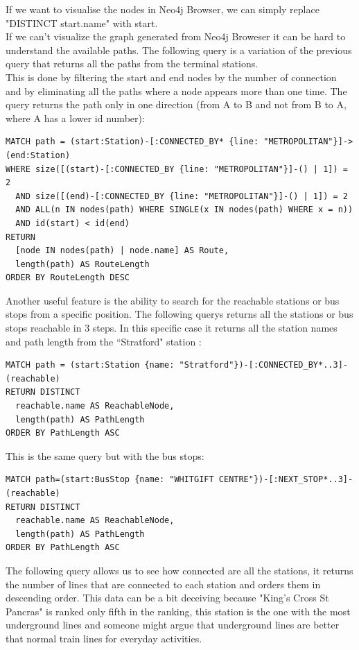 \documentclass{Configuration_Files/PoliMi3i_thesis}
\begin{document}
If we want to visualise the nodes in Neo4j Browser, we can simply replace "DISTINCT start.name" with start.\\

If we can't visualize the graph generated from Neo4j Broweser it can be hard to understand the available paths. The following query is a variation of the previous query that returns all the paths from the terminal stations.\\
This is done by filtering the start and end nodes by the number of connection and by eliminating all the paths where a node appears more than one time. The query returns the path only in one direction (from A to B and not from B to A, where A has a lower id number):

\begin{lstlisting}[language=Cypher]
MATCH path = (start:Station)-[:CONNECTED_BY* {line: "METROPOLITAN"}]->(end:Station)
WHERE size([(start)-[:CONNECTED_BY {line: "METROPOLITAN"}]-() | 1]) = 2
  AND size([(end)-[:CONNECTED_BY {line: "METROPOLITAN"}]-() | 1]) = 2
  AND ALL(n IN nodes(path) WHERE SINGLE(x IN nodes(path) WHERE x = n))
  AND id(start) < id(end)
RETURN 
  [node IN nodes(path) | node.name] AS Route,
  length(path) AS RouteLength
ORDER BY RouteLength DESC
\end{lstlisting}

Another useful feature is the ability to search for the reachable stations or bus stops from a specific position.
The following querys returns all the stations or bus stops reachable in 3 steps. In this specific case it returns all the station names and path length from the ``Stratford" station :

\begin{lstlisting}[language=Cypher]
MATCH path = (start:Station {name: "Stratford"})-[:CONNECTED_BY*..3]-(reachable)
RETURN DISTINCT 
  reachable.name AS ReachableNode,
  length(path) AS PathLength
ORDER BY PathLength ASC
\end{lstlisting}

This is the same query but with the bus stops:

\begin{lstlisting}[language=Cypher]
MATCH path=(start:BusStop {name: "WHITGIFT CENTRE"})-[:NEXT_STOP*..3]-(reachable)
RETURN DISTINCT 
  reachable.name AS ReachableNode,
  length(path) AS PathLength
ORDER BY PathLength ASC
\end{lstlisting}

The following query allows us to see how connected are all the stations, it returns the number of lines that are connected to each station and orders them in descending order. This data can be a bit deceiving because "King's Cross St Pancras" is ranked only fifth in the ranking, this station is the one with the most underground lines and someone might argue that underground lines are better that normal train lines for everyday activities.
\end{document}
